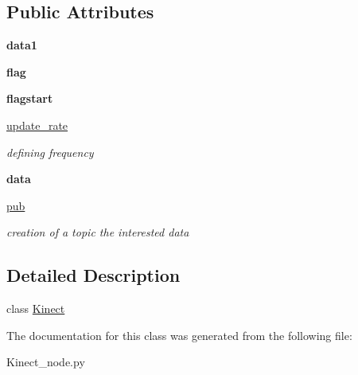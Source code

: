 \subsection*{Public Attributes}
\begin{DoxyCompactItemize}
\item 
{\bfseries data1}\hypertarget{classKinect__node_1_1Kinect_a5f313fce01efc2bb22659e8ac579f6f8}{}\label{classKinect__node_1_1Kinect_a5f313fce01efc2bb22659e8ac579f6f8}

\item 
{\bfseries flag}\hypertarget{classKinect__node_1_1Kinect_a08b726f7c6d6fefbe15ed98325ce3a2a}{}\label{classKinect__node_1_1Kinect_a08b726f7c6d6fefbe15ed98325ce3a2a}

\item 
{\bfseries flagstart}\hypertarget{classKinect__node_1_1Kinect_a0fe62627028382ffa28b4354aa1cfea7}{}\label{classKinect__node_1_1Kinect_a0fe62627028382ffa28b4354aa1cfea7}

\item 
\hyperlink{classKinect__node_1_1Kinect_a08528ddb2bc98e179b6428ee1ce79e6e}{update\+\_\+rate}\hypertarget{classKinect__node_1_1Kinect_a08528ddb2bc98e179b6428ee1ce79e6e}{}\label{classKinect__node_1_1Kinect_a08528ddb2bc98e179b6428ee1ce79e6e}

\begin{DoxyCompactList}\small\item\em defining frequency \end{DoxyCompactList}\item 
{\bfseries data}\hypertarget{classKinect__node_1_1Kinect_a20848834d4823200459263f0486693df}{}\label{classKinect__node_1_1Kinect_a20848834d4823200459263f0486693df}

\item 
\hyperlink{classKinect__node_1_1Kinect_a97e982cd145341ebf4fadd5959bfb237}{pub}\hypertarget{classKinect__node_1_1Kinect_a97e982cd145341ebf4fadd5959bfb237}{}\label{classKinect__node_1_1Kinect_a97e982cd145341ebf4fadd5959bfb237}

\begin{DoxyCompactList}\small\item\em creation of a topic the interested data \end{DoxyCompactList}\end{DoxyCompactItemize}


\subsection{Detailed Description}
class \hyperlink{classKinect__node_1_1Kinect}{Kinect} 

The documentation for this class was generated from the following file\+:\begin{DoxyCompactItemize}
\item 
Kinect\+\_\+node.\+py\end{DoxyCompactItemize}
